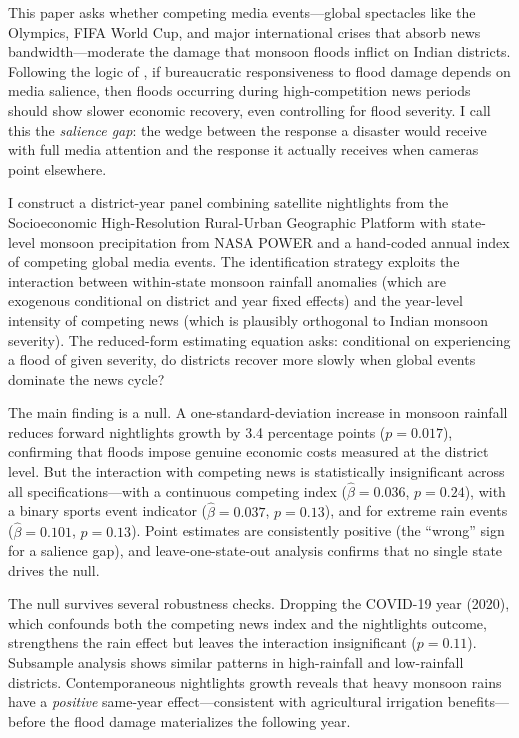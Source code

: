 \documentclass[12pt]{article}
\begin{document}
This paper asks whether competing media events---global spectacles like the Olympics, FIFA World Cup, and major international crises that absorb news bandwidth---moderate the damage that monsoon floods inflict on Indian districts. Following the logic of \citet{eisensee2007}, if bureaucratic responsiveness to flood damage depends on media salience, then floods occurring during high-competition news periods should show slower economic recovery, even controlling for flood severity. I call this the \textit{salience gap}: the wedge between the response a disaster would receive with full media attention and the response it actually receives when cameras point elsewhere.

I construct a district-year panel combining satellite nightlights from the Socioeconomic High-Resolution Rural-Urban Geographic Platform \citep[SHRUG;][]{asher2021} with state-level monsoon precipitation from NASA POWER and a hand-coded annual index of competing global media events. The identification strategy exploits the interaction between within-state monsoon rainfall anomalies (which are exogenous conditional on district and year fixed effects) and the year-level intensity of competing news (which is plausibly orthogonal to Indian monsoon severity). The reduced-form estimating equation asks: conditional on experiencing a flood of given severity, do districts recover more slowly when global events dominate the news cycle?

The main finding is a null. A one-standard-deviation increase in monsoon rainfall reduces forward nightlights growth by 3.4 percentage points ($p = 0.017$), confirming that floods impose genuine economic costs measured at the district level. But the interaction with competing news is statistically insignificant across all specifications---with a continuous competing index ($\hat{\beta} = 0.036$, $p = 0.24$), with a binary sports event indicator ($\hat{\beta} = 0.037$, $p = 0.13$), and for extreme rain events ($\hat{\beta} = 0.101$, $p = 0.13$). Point estimates are consistently positive (the ``wrong'' sign for a salience gap), and leave-one-state-out analysis confirms that no single state drives the null.

The null survives several robustness checks. Dropping the COVID-19 year (2020), which confounds both the competing news index and the nightlights outcome, strengthens the rain effect but leaves the interaction insignificant ($p = 0.11$). Subsample analysis shows similar patterns in high-rainfall and low-rainfall districts. Contemporaneous nightlights growth reveals that heavy monsoon rains have a \textit{positive} same-year effect---consistent with agricultural irrigation benefits---before the flood damage materializes the following year.
\end{document}
